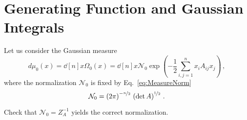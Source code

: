 \documentclass[notes.tex]{subfiles}
\begin{document}
\section{Generating Function and Gaussian Integrals}
\label{sec:gener-funct-gauss}

Let us consider the Gaussian measure
\begin{equation}
  \label{eq:GaussMeas}
  d\mu_0(x) = \dd[n]{x} \Omega_0(x) = \dd[n]{x} \mathcal{N}_0 \exp\left(
  -\frac12 \sum_{i,j=1}^n x_i A_{ij} x_j
  \right)\, ,
\end{equation}
where the normalization $\mathcal{N}_0$ is fixed by Eq.~\ref{eq:MeasureNorm}
\begin{equation}
  \label{eq:GaussNorm}
  \mathcal{N}_0 = \left(2\pi\right)^{-\nicefrac{n}{2}}\, \left( \det A\right)^{\nicefrac{1}{2}}\, .
\end{equation}

\begin{Ex}
  Check that $\mathcal{N}_0=Z_A^{-1}$ yields the correct normalization.
\end{Ex}
\end{document}
